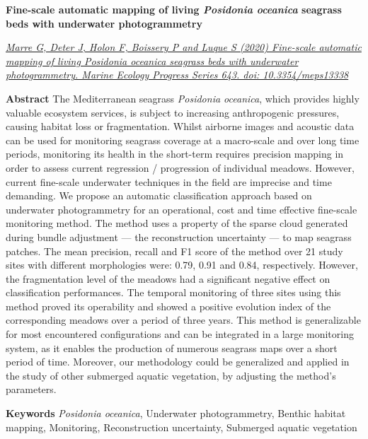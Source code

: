 \clearpage

\noindent\textbf{Fine-scale automatic mapping of living \textit{Posidonia oceanica} seagrass beds with underwater photogrammetry}


\noindent\href{https://doi.org/10.3354/meps13338}{\textit{Marre G, Deter J, Holon F, Boissery P and Luque S (2020) Fine-scale automatic mapping of living \textit{Posidonia oceanica} seagrass beds with underwater photogrammetry. Marine Ecology Progress Series 643. doi: 10.3354/meps13338}}

\medskip

\noindent\textbf{Abstract}
The Mediterranean seagrass \textit{Posidonia oceanica}, which provides highly valuable ecosystem services, is subject to increasing anthropogenic pressures, causing habitat loss or fragmentation. Whilst airborne images and acoustic data can be used for monitoring seagrass coverage at a macro-scale and over long time periods, monitoring its health in the short-term requires precision mapping in order to assess current regression / progression of individual meadows. However, current fine-scale underwater techniques in the field are imprecise and time demanding. We propose an automatic classification approach based on underwater photogrammetry for an operational, cost and time effective fine-scale monitoring method. The method uses a property of the sparse cloud generated during bundle adjustment --- the reconstruction uncertainty --- to map seagrass patches. The mean precision, recall and F1 score of the method over 21 study sites with different morphologies were: 0.79, 0.91 and 0.84, respectively. However, the fragmentation level of the meadows had a significant negative effect on classification performances. The temporal monitoring of three sites using this method proved its operability and showed a positive evolution index of the corresponding meadows over a period of three years. This method is generalizable for most encountered configurations and can be integrated in a large monitoring system, as it enables the production of numerous seagrass maps over a short period of time. Moreover, our methodology could be generalized and applied in the study of other submerged aquatic vegetation, by adjusting the method’s parameters.

\noindent\textbf{Keywords}
\textit{Posidonia oceanica}, Underwater photogrammetry, Benthic habitat mapping, Monitoring, Reconstruction uncertainty, Submerged aquatic vegetation

